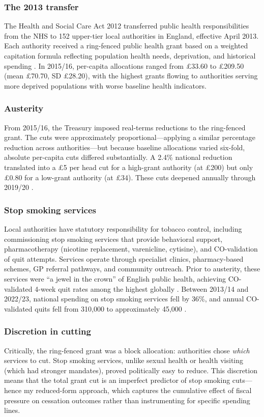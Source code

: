 \documentclass[12pt]{article}
\begin{document}
\subsubsection*{The 2013 transfer} The Health and Social Care Act 2012 transferred public health responsibilities from the NHS to 152 upper-tier local authorities in England, effective April 2013. Each authority received a ring-fenced public health grant based on a weighted capitation formula reflecting population health needs, deprivation, and historical spending \citep{dhsc2013formula}. In 2015/16, per-capita allocations ranged from \pounds33.60 to \pounds209.50 (mean \pounds70.70, SD \pounds28.20), with the highest grants flowing to authorities serving more deprived populations with worse baseline health indicators.

\subsubsection*{Austerity} From 2015/16, the Treasury imposed real-terms reductions to the ring-fenced grant. The cuts were approximately proportional---applying a similar percentage reduction across authorities---but because baseline allocations varied six-fold, absolute per-capita cuts differed substantially. A 2.4\% national reduction translated into a \pounds5 per head cut for a high-grant authority (at \pounds200) but only \pounds0.80 for a low-grant authority (at \pounds34). These cuts deepened annually through 2019/20 \citep{kingsfund2023spending}.

\subsubsection*{Stop smoking services} Local authorities have statutory responsibility for tobacco control, including commissioning stop smoking services that provide behavioral support, pharmacotherapy (nicotine replacement, varenicline, cytisine), and CO-validation of quit attempts. Services operate through specialist clinics, pharmacy-based schemes, GP referral pathways, and community outreach. Prior to austerity, these services were ``a jewel in the crown'' of English public health, achieving CO-validated 4-week quit rates among the highest globally \citep{west2013smokefree, bauld2012effectiveness}. Between 2013/14 and 2022/23, national spending on stop smoking services fell by 36\%, and annual CO-validated quits fell from 310,000 to approximately 45,000 \citep{ash2023firstten}.

\subsubsection*{Discretion in cutting} Critically, the ring-fenced grant was a block allocation: authorities chose \textit{which} services to cut. Stop smoking services, unlike sexual health or health visiting (which had stronger mandates), proved politically easy to reduce. This discretion means that the total grant cut is an imperfect predictor of stop smoking cuts---hence my reduced-form approach, which captures the cumulative effect of fiscal pressure on cessation outcomes rather than instrumenting for specific spending lines.
\end{document}
